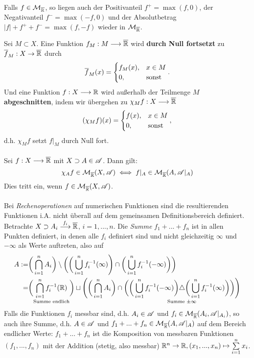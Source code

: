 \begin{korollar}
Falls $f \in \MM_{\ol\R}$, so liegen auch der Positivanteil $f^+=\max(f,0)$, der Negativanteil  $f^-=\max(-f,0)$ und der Absolutbetrag $|f|+f^++f^-=\max (f,-f)$ wieder in $\MM_{\ol\R}$.
\end{korollar}
Sei $M\subset X$. Eine Funktion $f_M:M\longrightarrow\ol\R$ wird \textbf{durch Null fortsetzt} zu $\ol{f}_M:X\to\ol\R$ durch
$$
\ol{f}_M(x)=\begin{cases}
f_M(x), &x\in M\\
0, &\te{sonst}
\end{cases}.
$$
Und eine Funktion $f:X\longrightarrow \R$ wird außerhalb der Teilmenge $M$ \textbf{abgeschnitten}, indem wir übergehen zu $\chi_M f:X \longrightarrow\ol{\R}$
$$
(\chi_M f)(x)=\begin{cases}
f(x), & x\in M\\
0, &\te{sonst}
\end{cases},
$$
d.h. $\chi_M f$ setzt $f|_M$ durch Null fort.\\\\
Sei $f:X\longrightarrow \ol\R$ mit $X\supset A\in \AA$. Dann gilt:
$$
\chi_Af \in \MM_{\ol\R}(X,\AA) \iff f|_A \in \MM_{\ol\R}(A,\AA|_A)
$$
Dies tritt ein, wenn $f\in \MM_{\ol\R}(X,\AA)$.\\\\
Bei \emph{Rechenoperationen} auf numerischen Funktionen sind die resultierenden Funktionen i.A. nicht überall auf dem gemeinsamen Definitionsbereich definiert. Betrachte $X\supset A_i \overset{f_i}\longrightarrow \ol\R$, $i=1,...,n$. Die \emph{Summe} $f_1+...+f_n$ ist in allen Punkten definiert, in denen alle $f_i$ definiert sind und nicht gleichzeitig $\infty$ und $-\infty$ als Werte auftreten, also auf
\begin{equation*}
\begin{split}
A:= &\bigg( \bigcap_{i=1}^n A_i\bigg) \setminus \bigg( \bigg( \bigcup_{i=1}^n f^{-1}_i(\infty)\Bigg) \cap \bigg( \bigcup_{i=1}^n f_i^{-1}(-\infty) \bigg)\bigg)\\
= &\bigg(\underset{\te{Summe endlich}}{\bigcap_{i=1}^n f^{-1}_i(\R)}\bigg) \sqcup \Bigg( \bigg( \bigcap_{i=1}^n A_i \bigg) \cap \bigg( \underset{\te{Summe }\pm \infty}{\bigg( \bigcup_{i=1}^n f_i^{-1}(-\infty)\bigg) \triangle \bigg(\bigcup_{i=1}^n f^{-1}_i(\infty)\bigg)\bigg)}\Bigg)
\end{split}
\end{equation*}
Falls die Funktionen $f_i$ messbar sind, d.h. $A_i \in \AA$ und $f_i \in \MM_{\ol\R}(A_i,\AA|_{A_i})$, so auch ihre Summe, d.h. $A\in \AA$ und $f_1+...+f_n \in \MM_{\ol\R}(A,\AA|_A)$ auf dem Bereich endlicher Werte: $f_1+...+f_n$ ist die Komposition von messbaren Funktionen $(f_1,...,f_n)$ mit der Addition (stetig, also messbar) $\R^n \to \R, (x_1,...,x_n)\mapsto \sum\limits_{i=1}^n x_i$.

